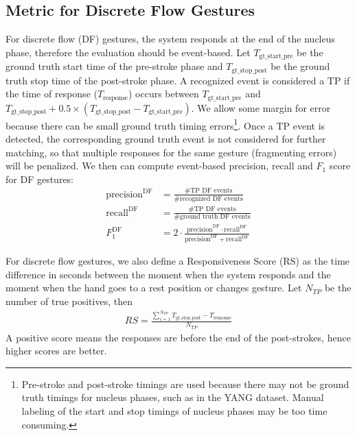 \subsection{Metric for Discrete Flow Gestures}
For discrete flow (DF) gestures, the system responds at the end of the nucleus
phase, therefore the evaluation should be event-based. Let
$T_{{\text{gt\_start\_pre}}}$ be the ground truth start time of the pre-stroke phase and
$T_{{\text{gt\_stop\_post}}}$ be the ground truth stop time of the post-stroke
phase.
A recognized event is considered a TP if the time of response ($T_{\text{response}}$) 
occurs between $T_{{\text{gt\_start\_pre}}}$ and $T_{{\text{gt\_stop\_post}}} +
0.5\times(T_{{\text{gt\_stop\_post}}} -
T_{\text{gt\_start\_pre}})$.
We allow some margin for error because there can be small ground truth timing errors\footnote{Pre-stroke and post-stroke
timings are used because there may not be ground truth timings for nucleus
phases, such as in the YANG dataset. Manual labeling of the start and stop
timings of nucleus phases may be too time consuming.}.
Once a TP event is detected, the corresponding ground truth event is not
considered for further matching, so that multiple responses for the same gesture
(fragmenting errors) will be penalized. We then can compute event-based
precision, recall and $F_1$ score for DF gestures:
\begin{align}
\text{precision}^{\text{DF}} &=\frac{\text{\# TP DF events}}{\text{\# recognized
DF events}}
\\
\text{recall}^{\text{DF}} &=\frac{\text{\# TP DF events}}{\text{\# ground truth
DF events}} \\
F_1^{\text{DF}} &= 2\cdot \frac{\text{precision}^{\text{DF}} \cdot
\text{recall}^{\text{DF}}}{\text{precision}^{\text{DF}} +
\text{recall}^{\text{DF}}}
\end{align}

For discrete flow gestures, we also define a Responsiveness Score (RS) as the
time difference in seconds between the moment when the system responds and the moment when the hand goes to a rest
position or changes gesture. Let $N_{TP}$ be the number of true positives, then
\begin{align}
RS = \frac{\sum_{i = 1}^{N_{TP}}T_{{\text{gt\_stop\_post}}} -
T_{\text{response}}}{N_{TP}}
\end{align}
A positive score means the responses are before the end of the post-strokes,
hence higher scores are better.

